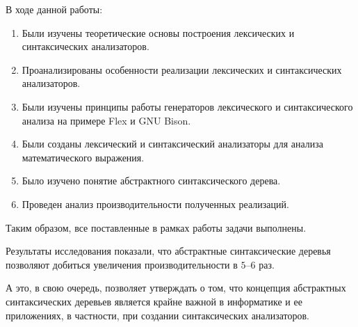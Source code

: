 В ходе данной работы:

\begin{enumerate}
    \item Были изучены теоретические основы построения лексических и
    синтаксических анализаторов.
    \item Проанализированы особенности реализации лексических и синтаксических
    анализаторов.
    \item Были изучены принципы работы генераторов лексического и
    синтаксического анализа на примере Flex и GNU Bison.
    \item Были созданы лексический и синтаксический анализаторы для анализа
    математического выражения.
    \item Было изучено понятие абстрактного синтаксического дерева.
    \item Проведен анализ производительности полученных реализаций.
\end{enumerate}

Таким образом, все поставленные в рамках работы задачи выполнены.

Результаты исследования показали, что абстрактные синтаксические деревья
позволяют добиться увеличения производительности в $5$--$6$ раз.

А это, в свою очередь, позволяет утверждать о том, что концепция абстрактных
синтаксических деревьев является крайне важной в информатике и ее приложениях, в
частности, при создании синтаксических анализаторов.